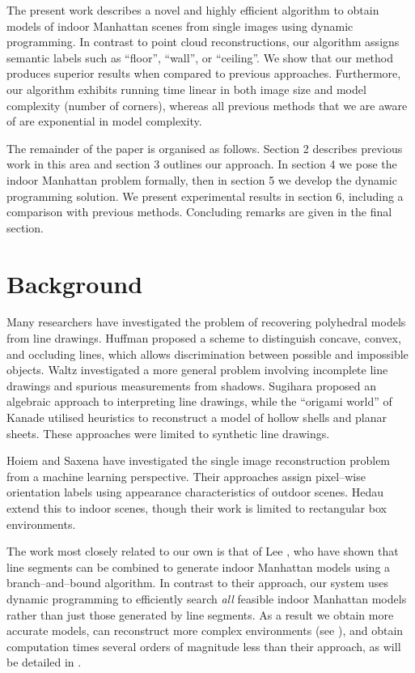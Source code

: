The present work describes a novel and highly efficient algorithm to
obtain models of indoor Manhattan scenes from single images using
dynamic programming. In contrast to point cloud reconstructions, our
algorithm assigns semantic labels such as ``floor'', ``wall'', or
``ceiling''. We show that our method produces superior results when
compared to previous approaches. Furthermore, our algorithm exhibits
running time linear in both image size and model complexity (number of
corners), whereas all previous methods that we are aware of
\cite{Lee09,Flint10} are exponential in model complexity.

The remainder of the paper is organised as follows. Section 2
describes previous work in this area and section 3 outlines our
approach. In section 4 we pose the indoor Manhattan problem formally,
then in section 5 we develop the dynamic programming solution. We
present experimental results in section 6, including a comparison with
previous methods. Concluding remarks are given in the final section.

\section{Background}

Many researchers have investigated the problem of recovering
polyhedral models from line drawings. Huffman \cite{Huffman71}
proposed a scheme to distinguish concave, convex, and occluding lines,
which allows discrimination between possible and impossible
objects. Waltz \cite{Waltz72} investigated a more general problem
involving incomplete line drawings and spurious measurements from
shadows. Sugihara \cite{Sugihara82} proposed an algebraic approach to
interpreting line drawings, while the ``origami world'' of Kanade
\cite{Kanade80} utilised heuristics to reconstruct a model of hollow
shells and planar sheets. These approaches were limited to synthetic
line drawings.

Hoiem \etal \cite{Hoiem05} and Saxena \etal \cite{Saxena09} have
investigated the single image reconstruction problem from a machine
learning perspective. Their approaches assign pixel--wise orientation
labels using appearance characteristics of outdoor scenes. Hedau \etal
\cite{Hedau09} extend this to indoor scenes, though their work is
limited to rectangular box environments.

The work most closely related to our own is that of Lee \etal
\cite{Lee09}, who have shown that line segments can be combined to
generate indoor Manhattan models using a branch--and--bound
algorithm. In contrast to their approach, our system uses dynamic
programming to efficiently search \textit{all} feasible indoor
Manhattan models rather than just those generated by line segments. As
a result we obtain more accurate models, can reconstruct more complex
environments (see ), and obtain computation times
several orders of magnitude less than their approach, as will be
detailed in .

